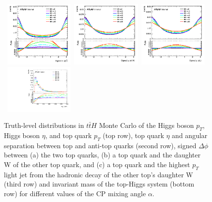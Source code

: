 \begin{figure}[!ht]
\begin{center}
{    }
    \mbox{ 
    \includegraphics[width=0.31\textwidth]{figures/tthcp_chapter/observables/ttH/c_delta_phi_tt_signed.png}
	\includegraphics[width=0.31\textwidth]{figures/tthcp_chapter/observables/ttH/c_delta_phi_tW_signed.png} 
	\includegraphics[width=0.31\textwidth]{figures/tthcp_chapter/observables/ttH/c_delta_phi_tj_signed.png} 
	}
	\mbox{ 
      \includegraphics[width=0.31\textwidth]{figures/tthcp_chapter/observables/ttH/c_tH_m.pdf}
    }
  \end{center}
  \caption{Truth-level distributions in $t\bar{t}H$ Monte Carlo of the Higgs boson $p_{T}$, Higgs boson $\eta$, and top quark $p_{T}$ (top row), top quark $\eta$ and angular separation between top and anti-top quarks (second row), signed $\Delta\phi$ between (a) the two top quarks, (b) a top quark and the daughter W of the other top quark, and (c) a top quark and the highest $p_{T}$ light jet from the hadronic decay of the other top's daughter W (third row) and invariant mass of the top-Higgs system (bottom row) for different values of the CP mixing angle $\alpha$.}
  \label{fig:ttH_truth}
\end{figure}


